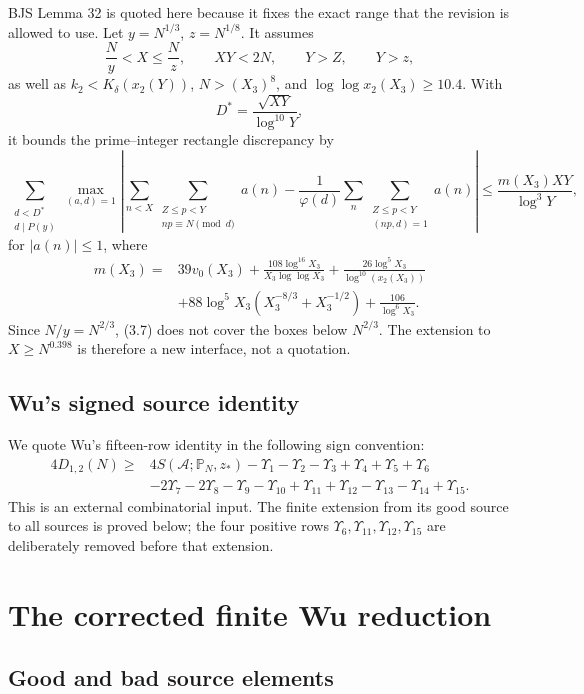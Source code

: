 \documentclass[11pt]{article}
\theoremstyle{definition}
\newcommand{\cA}{\mathcal A}
\newcommand{\Ups}{\Upsilon}
\begin{document}
BJS Lemma 32 is quoted here because it fixes the exact range that the
revision is allowed to use.  Let \(y=N^{1/3}\), \(z=N^{1/8}\).  It assumes
\[
 \frac Ny<X\le\frac Nz,\qquad XY<2N,\qquad Y>Z,\qquad Y>z,
\tag{3.7}
\]
as well as \(k_2<K_\delta(x_2(Y))\), \(N>(X_3)^8\), and
\(\log\log x_2(X_3)\ge10.4\).  With
\[
 D^*=\frac{\sqrt{XY}}{\log^{10}Y},
\tag{3.8}
\]
it bounds the prime--integer rectangle discrepancy by
\[
 \sum_{\substack{d<D^*\\d\mid P(y)}}\max_{(a,d)=1}
 \left|
 \sum_{n<X}\sum_{\substack{Z\le p<Y\\np\equiv N\pmod d}}a(n)
 -\frac1{\varphi(d)}
 \sum_n\sum_{\substack{Z\le p<Y\\(np,d)=1}}a(n)
 \right|
 \le \frac{m(X_3)XY}{\log^3Y},
\tag{3.9}
\]
for \(|a(n)|\le1\), where
\[
\begin{aligned}
 m(X_3)={}&39v_0(X_3)
 +\frac{108\log^{16}X_3}{X_3\log\log X_3}
 +\frac{26\log^5X_3}{\log^{10}(x_2(X_3))}\\
 &+88\log^5X_3\left(X_3^{-8/3}+X_3^{-1/2}\right)
 +\frac{106}{\log^6X_3}.
\end{aligned}
\tag{3.10}
\]
Since \(N/y=N^{2/3}\), (3.7) does not cover the boxes below
\(N^{2/3}\).  The extension to \(X\ge N^{0.398}\) is therefore a new
interface, not a quotation.

\subsection{Wu's signed source identity}
\label{sec:wu-input}

We quote Wu's fifteen-row identity in the following sign convention:
\[
\begin{aligned}
4D_{1,2}(N)\ge{}&
4S(\cA;\mathbb P_N,z_*)-\Ups_1-\Ups_2-\Ups_3
 +\Ups_4+\Ups_5+\Ups_6\\
&-2\Ups_7-2\Ups_8-\Ups_9-\Ups_{10}
 +\Ups_{11}+\Ups_{12}-\Ups_{13}-\Ups_{14}+\Ups_{15}.
\end{aligned}
\tag{3.11}
\]
This is an external combinatorial input.  The finite extension from its good
source to all sources is proved below; the four positive rows
\(\Ups_6,\Ups_{11},\Ups_{12},\Ups_{15}\) are deliberately removed before
that extension.

\section{The corrected finite Wu reduction}
\label{sec:wu}

\subsection{Good and bad source elements}
\label{sec:bad}
\end{document}
